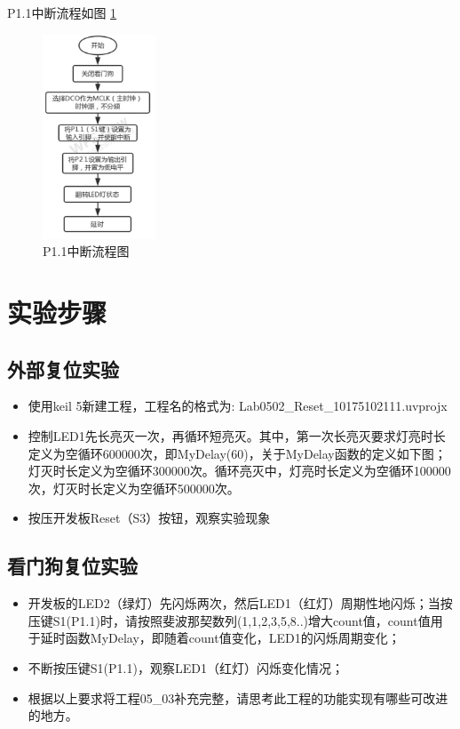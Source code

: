 \documentclass[a4paper,10pt,UTF8]{paper}
\numberwithin{equation}{section}
\numberwithin{figure}{section}
\begin{document}
P1.1中断流程如图 \ref{fig:5}

\begin{figure}[h]
  \centering
  \includegraphics[width=0.3\textwidth]{5.png}
  \caption{P1.1中断流程图}
  \label{fig:5}
\end{figure}

\section{实验步骤}

\subsection{外部复位实验}

\begin{itemize}
  \item 使用keil 5新建工程，工程名的格式为: Lab0502\_Reset\_10175102111.uvprojx
  \item 控制LED1先长亮灭一次，再循环短亮灭。其中，第一次长亮灭要求灯亮时长定义为空循环600000次，即MyDelay(60)，关于MyDelay函数的定义如下图；灯灭时长定义为空循环300000次。循环亮灭中，灯亮时长定义为空循环100000次，灯灭时长定义为空循环500000次。
  \item 按压开发板Reset（S3）按钮，观察实验现象
\end{itemize}

\subsection{看门狗复位实验}

\begin{itemize}
  \item 开发板的LED2（绿灯）先闪烁两次，然后LED1（红灯）周期性地闪烁；当按压键S1(P1.1)时，请按照斐波那契数列(1,1,2,3,5,8..)增大count值，count值用于延时函数MyDelay，即随着count值变化，LED1的闪烁周期变化；
  \item 不断按压键S1(P1.1)，观察LED1（红灯）闪烁变化情况；
  \item 根据以上要求将工程05\_03补充完整，请思考此工程的功能实现有哪些可改进的地方。
\end{itemize}
\end{document}
